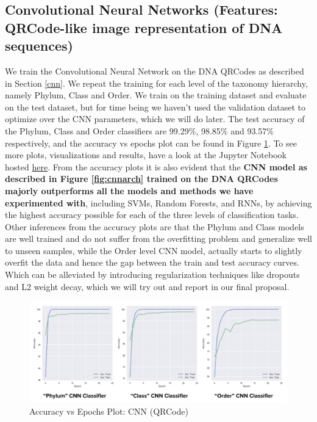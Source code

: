 \documentclass[12pt]{article}
\begin{document}
        \subsection{Convolutional Neural Networks (Features: QRCode-like image representation of DNA sequences)}
        We train the Convolutional Neural Network on the DNA QRCodes as described in Section \ref{cnn}. We repeat the training for each level of the taxonomy hierarchy, namely Phylum, Class and Order. We train on the training dataset and evaluate on the test dataset, but for time being we haven't used the validation dataset to optimize over the CNN parameters, which we will do later. The test accuracy of the Phylum, Class and Order classifiers are 99.29\%, 98.85\% and 93.57\% respectively, and the accuracy vs epochs plot can be found in Figure \ref{fig:cnnacc}. To see more plots, visualizations and results, have a look at the Jupyter Notebook hosted {\color{blue}\href{https://nbviewer.jupyter.org/urls/dl.dropbox.com/s/ynwxw8pd82x1mi2/CNN\%20-\%20DNA\%20QRCode\%20Based.ipynb}{here}}.
        \newline
        From the accuracy plots it is also evident that the \textbf{CNN model as described in Figure \ref{fig:cnnarch} trained on the DNA QRCodes majorly outperforms all the models and methods we have experimented with}, including SVMs, Random Forests, and RNNs, by achieving the highest accuracy possible for each of the three levels of classification tasks. Other inferences from the accuracy plots are that the Phylum and Class models are well trained and do not suffer from the overfitting problem and generalize well to unseen samples, while the Order level CNN model, actually starts to slightly overfit the data and hence the gap between the train and test accuracy curves. Which can be alleviated by introducing regularization techniques like dropouts and L2 weight decay, which we will try out and report in our final proposal.

        \begin{figure}[h]
        \centering
        \includegraphics[scale=0.35]{cnn_acc_plots.png}
        \caption{Accuracy vs Epochs Plot: CNN (QRCode)}
        \label{fig:cnnacc}
        \end{figure}
\end{document}

